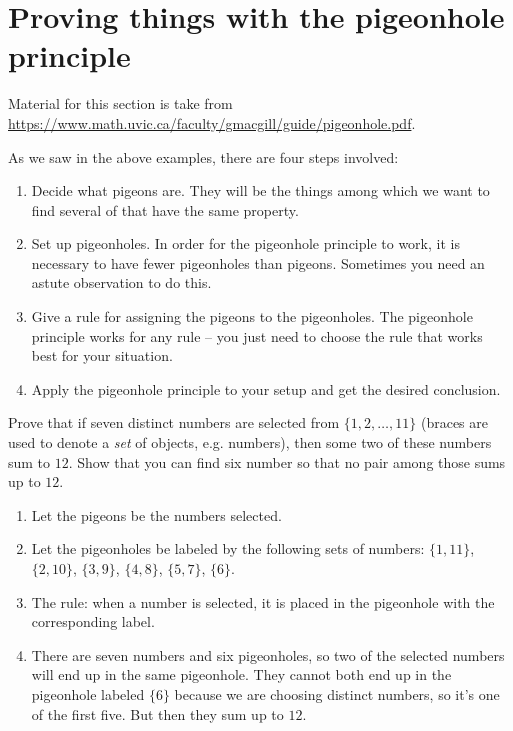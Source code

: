 \section{Proving things with the pigeonhole principle}

Material for this section is take from
\url{https://www.math.uvic.ca/faculty/gmacgill/guide/pigeonhole.pdf}.

As we saw in the above examples, there are four steps involved:
\begin{enumerate}
    \item Decide what pigeons are. They will be the things among which we want to find several of that have the same property.
    \item Set up pigeonholes. In order for the pigeonhole principle to work, it is necessary to have fewer pigeonholes than pigeons. Sometimes you need an astute observation to do this.
    \item Give a rule for assigning the pigeons to the pigeonholes. The pigeonhole principle works for any rule -- you just need to choose the rule that works best for your situation.
    \item Apply the pigeonhole principle to your setup and get the desired conclusion.
\end{enumerate}

\begin{exercise}
Prove that if seven distinct numbers are selected from $\{1, 2,\dots, 11\}$ (braces are used to denote a \emph{set} of objects, e.g. numbers),
then some two of these numbers sum to $12$. Show that you can find six number so that no pair among those sums up to $12$. 
\end{exercise}

\begin{enumerate}
    \item Let the pigeons be the numbers selected.
    \item Let the pigeonholes be labeled by the following sets of numbers: $\{ 1,11 \}$, $\{ 2,10 \}$, $\{ 3,9 \}$, $\{ 4,8 \}$, $\{ 5,7 \}$, $\{ 6 \}$.
    \item The rule: when a number is selected, it is placed in the pigeonhole with the corresponding label.
    \item There are seven numbers and six pigeonholes, so two of the selected numbers will end up in the same pigeonhole. They cannot both end up in the pigeonhole labeled $\{6\}$ because we are choosing distinct numbers, so it's one of the first five. But then they sum up to $12$.
\end{enumerate}

